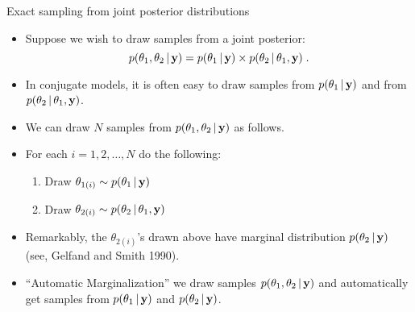 \begin{frame}{Exact sampling from joint posterior distributions}

\begin{itemize}\setlength{\itemsep}{0.25cm}
\item Suppose we wish to draw samples from a joint posterior:
\[
 p(\theta_1,\theta_2\,|\, \textbf{y}) = p(\theta_1\,|\, \textbf{y}) \times p(\theta_2\,|\, \theta_1, \textbf{y})\; .
\]

\item In conjugate models, it is often easy to draw samples from $p(\theta_1\,|\, \textbf{y})$ and from $p(\theta_2\,|\, \theta_1,\textbf{y})$. 

\item We can draw $N$ samples from $p(\theta_1,\theta_2\,|\, \textbf{y})$ as follows.

\item For each $i=1,2,\ldots,N$ do the following: 
 \begin{enumerate}\setlength{\itemsep}{0cm}
  \item Draw $\displaystyle \theta_{1(i)} \sim p(\theta_1\,|\, \textbf{y})$
  \item Draw $\displaystyle \theta_{2(i)} \sim p(\theta_2\,|\, \theta_1,\textbf{y})$
 \end{enumerate}

\item Remarkably, the $\theta_{2(i)}$'s drawn above have marginal distribution $p(\theta_2\,|\, \textbf{y})$ (see, Gelfand and Smith 1990). %

\item ``Automatic Marginalization'' we draw samples $p(\theta_1,\theta_2\,|\, \textbf{y})$ and automatically get samples from $p(\theta_1\,|\, \textbf{y})$ and $p(\theta_2\,|\, \textbf{y})$.

\end{itemize}

\end{frame}

